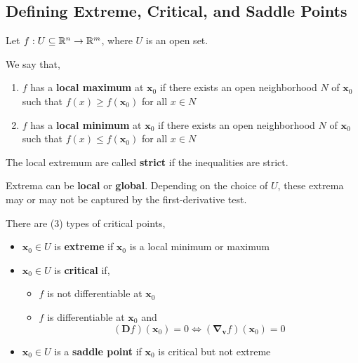 \subsection{Defining Extreme, Critical, and Saddle Points}
Let $f: U \subseteq \mathbb{R}^n \rightarrow \mathbb{R}^m$, where $U$ is an open set.

\begin{defn}
    We say that,
    \begin{enumerate}
        \sloppy
        \item $f$ has a \textbf{local maximum} at $\mathbf{x}_0$ if there exists an open neighborhood $N$ of $\mathbf{x}_0$ such that $f(x) \geq f(\mathbf{x}_0)$ for all $x \in N$
        \item $f$ has a \textbf{local minimum} at $\mathbf{x}_0$ if there exists an open neighborhood $N$ of $\mathbf{x}_0$ such that $f(x) \leq f(\mathbf{x}_0)$  for all $x \in N$
    \end{enumerate}
    The local extremum are called \textbf{strict} if the inequalities are strict.
\end{defn}

\begin{marginfigure}
    Extrema can be \textbf{local} or \textbf{global}. Depending on the choice of $U$, these extrema may or may not be captured by the first-derivative test.
\end{marginfigure}

\begin{defn}
    There are (3) types of critical points,
    \begin{itemize}
        \item $\mathbf{x}_0 \in U$ is \textbf{extreme} if $\mathbf{x}_0$ is a local minimum or maximum
        \item $\mathbf{x}_0 \in U$ is \textbf{critical} if,
        \begin{itemize}
            \item $f$ is not differentiable at $\mathbf{x}_0$
            \item $f$ is differentiable at $\mathbf{x}_0$ and
            \[(\mathbf{D} f)(\mathbf{x}_0) = 0 \iff \left(\mathbf{\nabla}_{\mathbf{v}} f\right)\left(\mathbf{x}_0\right) = 0\]
        \end{itemize}
        \item $\mathbf{x}_0 \in U$ is a \textbf{saddle point} if $\mathbf{x}_0$ is critical but not extreme
    \end{itemize}
\end{defn}

